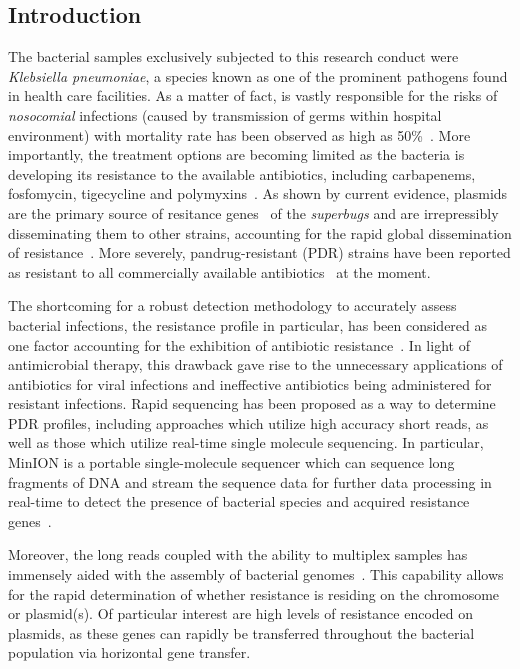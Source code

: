 \subsection{Introduction}
The bacterial samples exclusively subjected to this research conduct were \emph{Klebsiella pneumoniae}, a species known as one of the prominent pathogens found in health care facilities.
As a matter of fact, \kp{} is vastly responsible for the risks of \emph{nosocomial} infections (caused by transmission of germs within hospital environment) with mortality rate has been observed as high as 50\%~\cite{Martin2018M1,Magill2014M2,Kalanuria2014M3,Talha2009M4,Podschun1998M5}. 
More importantly, the treatment options are becoming limited as the bacteria is developing its resistance to the available antibiotics, including carbapenems, fosfomycin, tigecycline and polymyxins~\cite{Karaiskos2014M7}. As shown by current evidence, plasmids are the primary source of resitance genes~\cite{HudsonBMW2014} of the \emph{superbugs} and are irrepressibly disseminating them to other strains, accounting for the rapid global dissemination of resistance~\cite{Martin2018M1,Navon2017M6}. 
More severely, pandrug-resistant (PDR) \kp{} strains have been reported as resistant to all commercially available antibiotics~\cite{Chen2017M8,Zowawi2015} at the moment.

The shortcoming for a robust detection methodology to accurately assess bacterial infections, the resistance profile in particular, has been considered as one factor accounting for the exhibition of antibiotic resistance~\cite{sommer2017M10}.
In light of antimicrobial therapy, this drawback gave rise to the unnecessary applications of antibiotics for viral infections and ineffective antibiotics being administered for resistant infections. 
Rapid sequencing has been proposed as a way to determine PDR profiles, including approaches which utilize high accuracy short reads, as well as those which utilize real-time single molecule sequencing. 
In particular, MinION is a portable single-molecule sequencer which can sequence long fragments of DNA and stream the sequence data for further data processing in real-time to detect the presence of bacterial species and acquired resistance genes~\cite{Gardy2018M11, Lemon2017M15,Votintseva2017M16,CaoGE2016,QuickAC2015}. 

Moreover, the long reads coupled with the ability to multiplex samples has immensely aided with the assembly of bacterial genomes~\cite{Nguyen2017barcode,Wick2017M12,Li2018M13,George2017M14}. 
This capability allows for the rapid determination of whether resistance is residing on the chromosome or plasmid(s). 
Of particular interest are high levels of resistance encoded on plasmids, as these genes can rapidly be transferred throughout the bacterial population via horizontal gene transfer.

